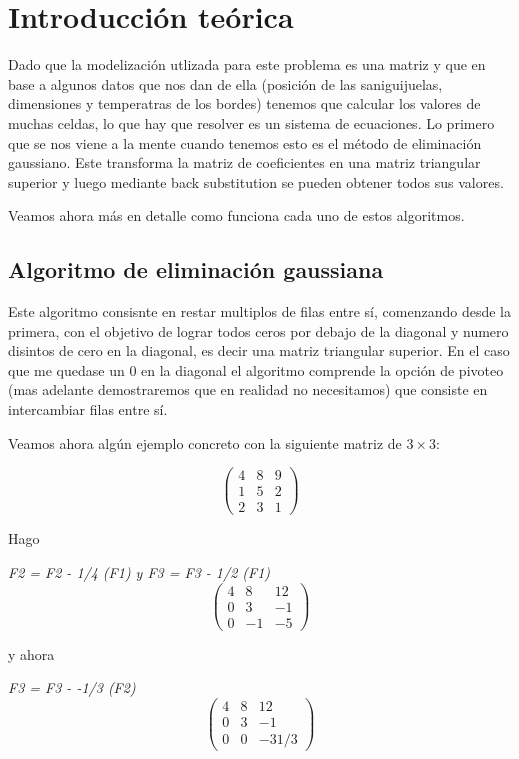 \section{Introducci\'on te\'orica}

Dado que la modelización utlizada para este problema es una matriz y que en base a algunos datos que nos dan de ella (posición de las saniguijuelas, dimensiones y temperatras de los bordes) tenemos que calcular los valores de muchas celdas, lo que hay que resolver es un sistema de ecuaciones. 
Lo primero que se nos viene a la mente cuando tenemos esto es el método de eliminación gaussiano. Este transforma la matriz de coeficientes en una matriz triangular superior y luego mediante back substitution se pueden obtener todos sus valores.

Veamos ahora más en detalle como funciona cada uno de estos algoritmos.

\subsection{Algoritmo de eliminación gaussiana}

Este algoritmo consisnte en restar multiplos de filas entre sí, comenzando desde la primera, con el objetivo de lograr todos ceros por debajo de la diagonal y numero disintos de cero en la diagonal, es decir una matriz triangular superior. En el caso que me quedase un 0 en la diagonal el algoritmo comprende la opción de pivoteo (mas adelante demostraremos que en realidad no necesitamos) que consiste en intercambiar filas entre sí.

Veamos ahora algún ejemplo concreto con la siguiente matriz de $3 \times 3$:

\[ \left( \begin{array}{ccc}
4 & 8 & 9 \\
1 & 5 & 2 \\
2 & 3 & 1 \end{array} \right)\] 

Hago 

\emph{F2 = F2 - 1/4 (F1) y F3 = F3 - 1/2 (F1)} 
\[ \left( \begin{array}{ccc}
4 & 8 & 12 \\
0 & 3 & -1 \\
0 & -1 & -5 \end{array} \right)\] 

y ahora

\emph{F3 = F3 - -1/3 (F2) } 
\[ \left( \begin{array}{ccc}
4 & 8 & 12 \\
0 & 3 & -1 \\
0 & 0 & -31/3 \end{array} \right)\] 

